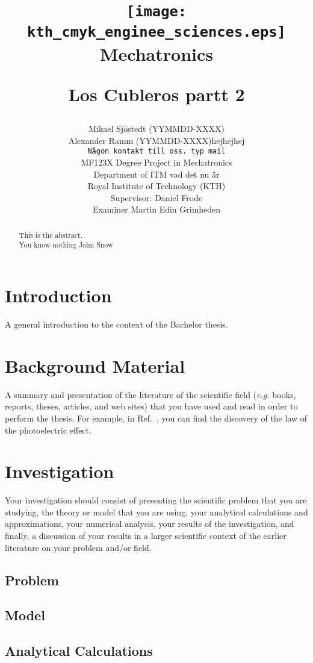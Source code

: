 \documentclass[12pt]{report}
\title{\vspace{-2.5cm}
\begin{center}
\texttt{[image: kth\_cmyk\_enginee\_sciences.eps]}\\[-1mm]
\hspace{-3mm} {\tiny {\sf Mechatronics}}
\end{center}
\vspace{5cm}
Los Cubleros partt 2}
\author{Mikael Sjöstedt (YYMMDD-XXXX) \\ Alexander Ramm (YYMMDD-XXXX)hejhejhej\\
{\tt Någon kontakt till oss. typ mail}\\
MF123X Degree Project in Mechatronics\\
Department of ITM vad det nu är \\
Royal Institute of Technology (KTH)\\
Supervisor: Daniel Frode \\
Examiner Martin Edin Grimheden}
\begin{document}
\maketitle

\begin{abstract}
This is the abstract. \\ You know nothing John Snow
\end{abstract}

\tableofcontents

\chapter{Introduction}

A general introduction to the context of the Bachelor thesis.

\chapter{Background Material}

A summary and presentation of the literature of the scientific field
({\it e.g.}  books, reports, theses, articles, and web sites) that you
have used and read in order to perform the thesis. For example, in
Ref.~\cite{einstein}, you can find the discovery of the law of the
photoelectric effect.

\chapter{Investigation}

Your investigation should consist of presenting the scientific problem
that you are studying, the theory or model that you are using, your
analytical calculations and approximations, your numerical analysis,
your results of the investigation, and finally, a discussion of your
results in a larger scientific context of the earlier literature on
your problem and/or field.

\section{Problem}

\section{Model}

\section{Analytical Calculations}
\end{document}

